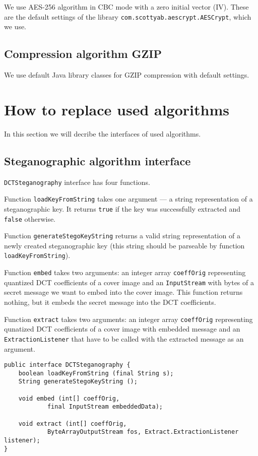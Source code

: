 We use AES-256 algorithm in CBC mode with a zero initial vector (IV). These are the default
settings of the library \texttt{com.scottyab.aescrypt.AESCrypt}, which we use.

\subsection{Compression algorithm GZIP}

We use default Java library classes for GZIP compression with default settings.

\section{How to replace used algorithms}
In this section we will decribe the interfaces of used algorithms.

\subsection{Steganographic algorithm interface}
\texttt{DCTSteganography} interface has four functions.

Function \texttt{loadKeyFromString} takes one argument --- 
a string representation of a steganographic key. It returns
\texttt{true} if the key was successfully extracted and
\texttt{false} otherwise.

Function \texttt{generateStegoKeyString} returns a 
valid string representation of a newly created steganographic key 
(this string should be parseable by function \texttt{loadKeyFromString}).

Function \texttt{embed} takes two arguments: an integer array \texttt{coeffOrig}
representing quantized DCT coefficients of a cover image and an \texttt{InputStream} 
with bytes of a secret message we want to embed into the cover image. 
This function returns nothing, but it embeds the secret message into
the DCT coefficients. 

Function \texttt{extract} takes two arguments: an integer array \texttt{coeffOrig}
representing qunatized DCT coefficients of a cover image with embedded message
and an \texttt{ExtractionListener} that have to be called with the extracted message
as an argument.

\begin{lstlisting} 
public interface DCTSteganography {
    boolean loadKeyFromString (final String s);
    String generateStegoKeyString ();

    void embed (int[] coeffOrig, 
            final InputStream embeddedData);

    void extract (int[] coeffOrig,  
            ByteArrayOutputStream fos, Extract.ExtractionListener listener);
}
\end{lstlisting}

